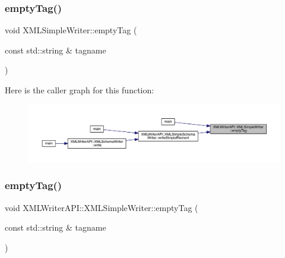 \mbox{\label{classXMLWriterAPI_1_1XMLSimpleWriter_ae40f02c969275fdde51866d8e9271717}} 
\subsubsection{\texorpdfstring{emptyTag()}{emptyTag()}\hspace{0.1cm}{\footnotesize\ttfamily [1/8]}}
{\footnotesize\ttfamily void X\+M\+L\+Simple\+Writer\+::empty\+Tag (\begin{DoxyParamCaption}\item[{const std\+::string \&}]{tagname }\end{DoxyParamCaption})}

Here is the caller graph for this function\+:\nopagebreak
\begin{figure}[H]
\begin{center}
\leavevmode
\includegraphics[width=350pt]{d5/de1/classXMLWriterAPI_1_1XMLSimpleWriter_ae40f02c969275fdde51866d8e9271717_icgraph}
\end{center}
\end{figure}
\mbox{\label{classXMLWriterAPI_1_1XMLSimpleWriter_ae75e5988a4d97721ee9be5c7a18abfc4}} 
\subsubsection{\texorpdfstring{emptyTag()}{emptyTag()}\hspace{0.1cm}{\footnotesize\ttfamily [2/8]}}
{\footnotesize\ttfamily void X\+M\+L\+Writer\+A\+P\+I\+::\+X\+M\+L\+Simple\+Writer\+::empty\+Tag (\begin{DoxyParamCaption}\item[{const std\+::string \&}]{tagname }\end{DoxyParamCaption})}

